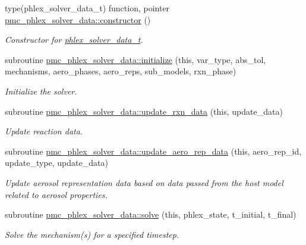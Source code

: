 \begin{DoxyCompactItemize}
\item 
type(phlex\+\_\+solver\+\_\+data\+\_\+t) function, pointer \mbox{\hyperlink{namespacepmc__phlex__solver__data_a30e0f4b080777d62bb7ee6c91f8612f5}{pmc\+\_\+phlex\+\_\+solver\+\_\+data\+::constructor}} ()
\begin{DoxyCompactList}\small\item\em Constructor for \mbox{\hyperlink{structpmc__phlex__solver__data_1_1phlex__solver__data__t}{phlex\+\_\+solver\+\_\+data\+\_\+t}}. \end{DoxyCompactList}\item 
subroutine \mbox{\hyperlink{namespacepmc__phlex__solver__data_ad82755c7a410cb104af0926103fec0ab}{pmc\+\_\+phlex\+\_\+solver\+\_\+data\+::initialize}} (this, var\+\_\+type, abs\+\_\+tol, mechanisms, aero\+\_\+phases, aero\+\_\+reps, sub\+\_\+models, rxn\+\_\+phase)
\begin{DoxyCompactList}\small\item\em Initialize the solver. \end{DoxyCompactList}\item 
subroutine \mbox{\hyperlink{namespacepmc__phlex__solver__data_ae05845ca2e0a3a239fa99a4e192c0dbb}{pmc\+\_\+phlex\+\_\+solver\+\_\+data\+::update\+\_\+rxn\+\_\+data}} (this, update\+\_\+data)
\begin{DoxyCompactList}\small\item\em Update reaction data. \end{DoxyCompactList}\item 
subroutine \mbox{\hyperlink{namespacepmc__phlex__solver__data_a01cf4ead58b0d4c2e250705bb54b1136}{pmc\+\_\+phlex\+\_\+solver\+\_\+data\+::update\+\_\+aero\+\_\+rep\+\_\+data}} (this, aero\+\_\+rep\+\_\+id, update\+\_\+type, update\+\_\+data)
\begin{DoxyCompactList}\small\item\em Update aerosol representation data based on data passed from the host model related to aerosol properties. \end{DoxyCompactList}\item 
subroutine \mbox{\hyperlink{namespacepmc__phlex__solver__data_a9c7300944e2df22a9a4d3592679e7eca}{pmc\+\_\+phlex\+\_\+solver\+\_\+data\+::solve}} (this, phlex\+\_\+state, t\+\_\+initial, t\+\_\+final)
\begin{DoxyCompactList}\small\item\em Solve the mechanism(s) for a specified timestep. \end{DoxyCompactList}\item 

\end{DoxyCompactItemize}
